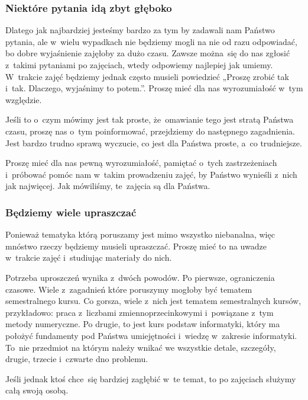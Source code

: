 \documentclass[10pt,t]{beamer}
\begin{document}
\begin{frame}
  \frametitle{Niektóre pytania idą zbyt głęboko}


  Dlatego jak najbardziej jesteśmy \alert{bardzo} za tym by zadawali nam
  Państwo pytania, ale w~wielu wypadkach nie będziemy mogli na nie od razu
  odpowiadać, bo
  dobre wyjaśnienie zajęłoby za dużo czasu. Zawsze można~się do nas
  zgłosić z~takimi pytaniami po zajęciach, wtedy odpowiemy najlepiej
  jak umiemy. W~trakcie zajęć będziemy jednak często musieli powiedzieć
  „Proszę zrobić tak i~tak. Dlaczego, wyjaśnimy to potem.”. Proszę mieć dla
  nas wyrozumiałość w~tym względzie.

  Jeśli to o~czym mówimy jest tak proste, że~omawianie tego jest stratą
  Państwa czasu, proszę nas o~tym poinformować, przejdziemy do następnego
  zagadnienia. Jest bardzo trudno sprawą wyczucie, co jest dla Państwa
  proste, a~co trudniejsze.

  Proszę mieć dla nas pewną wyrozumiałość, pamiętać o~tych zastrzeżeniach
  i~próbować pomóc nam w~takim prowadzeniu zajęć, by Państwo wynieśli z~nich
  jak najwięcej. Jak mówiliśmy, te~zajęcia są dla Państwa.

\end{frame}





\begin{frame}
  \frametitle{Będziemy wiele upraszczać}


  Ponieważ tematyka którą poruszamy jest mimo wszystko niebanalna, więc
  mnóstwo rzeczy będziemy musieli \alert{upraszczać}. Proszę mieć to na
  uwadze w~trakcie zajęć i~studiując materiały do nich.

  Potrzeba uproszczeń wynika z~dwóch powodów. Po pierwsze, ograniczenia
  czasowe. Wiele z~zagadnień które poruszymy mogłoby być tematem
  semestralnego kursu. Co gorsza, wiele z~nich \alert{jest} tematem
  semestralnych kursów, przykładowo: praca z~liczbami zmiennoprzecinkowymi
  i~powiązane z~tym metody numeryczne. Po drugie, to jest kurs
  \alert{podstaw} informatyki, który ma położyć fundamenty pod Państwa
  umiejętności i~wiedzę w~zakresie informatyki. To~nie przedmiot na którym
  należy wnikać we wszystkie detale, szczegóły, drugie, trzecie i~czwarte
  dno problemu.

  Jeśli jednak ktoś chce~się bardziej zagłębić w~te temat, to po zajęciach
  służymy całą swoją osobą.

\end{frame}
\end{document}
